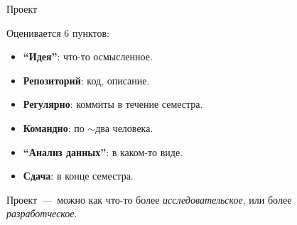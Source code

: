 \documentclass[russian]{beamer}
\begin{document}
  \begin{frame}{Проект}
  
    \pause
    
    Оценивается $6$ пунктов:
    
    \pause
  
    \begin{itemize}
      \item \textbf{``Идея''}: что-то осмысленное.
        \pause
      \item \textbf{Репозиторий}: код, описание.
        \pause
      \item \textbf{Регулярно}: коммиты в течение семестра.
        \pause
      \item \textbf{Командно}: по $\sim$два человека.
        \pause
      \item \textbf{``Анализ данных''}: в каком-то виде.
        \pause
      \item \textbf{Сдача}: в конце семестра.
    \end{itemize}
    
    \pause
    
    \begin{block}{}
      Проект~---~можно как что-то более \emph{исследовательское}, или более \emph{разработческое}.
    \end{block}
  \end{frame}
\end{document}
